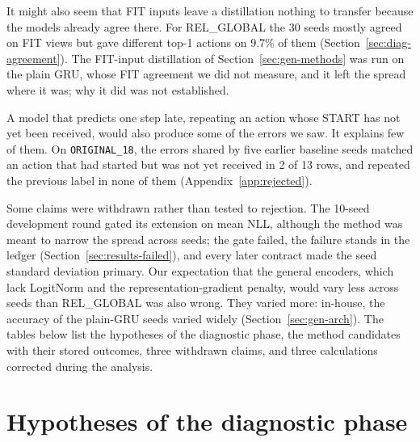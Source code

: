 It might also seem that FIT inputs leave a distillation nothing to
transfer because the models already agree there. For REL\_GLOBAL the
30 seeds mostly agreed on FIT views but gave different top-1 actions on
9.7\% of them (Section~\ref{sec:diag-agreement}). The FIT-input
distillation of Section~\ref{sec:gen-methods} was run on the plain
GRU, whose FIT agreement we did not measure, and it left the spread
where it was; why it did was not established.

A model that predicts one step late, repeating an action whose START
has not yet been received, would also produce some of the errors we
saw. It explains few of them. On \texttt{ORIGINAL\_18}, the errors
shared by five earlier baseline seeds matched an action that had started
but was not yet received in 2 of 13 rows, and repeated the previous
label in none of them (Appendix~\ref{app:rejected}).

Some claims were withdrawn rather than tested to rejection. The 10-seed
development round gated its extension on mean NLL, although the method
was meant to narrow the spread across seeds; the gate failed, the
failure stands in the ledger (Section~\ref{sec:results-failed}), and
every later contract made the seed standard deviation primary. Our
expectation that the general encoders, which lack LogitNorm and the
representation-gradient penalty, would vary less across seeds than
REL\_GLOBAL was also wrong. They varied more: in-house, the accuracy of
the plain-GRU seeds varied widely (Section~\ref{sec:gen-arch}). The tables below list the hypotheses of
the diagnostic phase, the method candidates with their stored outcomes,
three withdrawn claims, and three calculations corrected during the
analysis.

\section{Hypotheses of the diagnostic phase}
\label{sec:rej-hypotheses}


